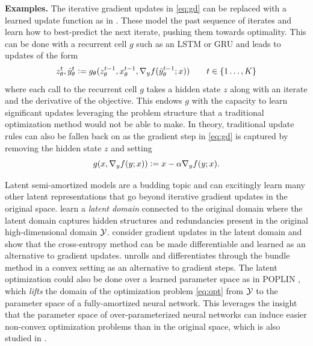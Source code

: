 \textbf{Examples.}
The iterative gradient updates in \cref{eq:gd}
can be replaced with a learned update function as in
\citet{ravi2016optimization,li2016learning,andrychowicz2016learning,li2017learning}.
These model the past sequence of iterates and learn how
to best-predict the next iterate, pushing them towards optimality.
This can be done with a recurrent cell $g$ such
as an LSTM \citep{hochreiter1997long} or GRU \citep{cho2014learning}
and leads to updates of the form
\begin{equation}
  z^t_\theta, \hat y^{t}_\theta \vcentcolon= g_\theta(z^{t-1}_\theta, x^{t-1}_\theta, \nabla_y f(\hat y^{t-1}_\theta; x)) \qquad t\in\{1\ldots,K\}
  \label{eq:rec}
\end{equation}
where each call to the recurrent cell $g$
takes a hidden state $z$ along with an iterate and
the derivative of the objective.
This endows $g$ with the capacity to learn significant
updates leveraging the problem structure that a
traditional optimization method would not be able
to make.
In theory, traditional update rules can also be
fallen back on as the gradient step in \cref{eq:gd}
is captured by removing the hidden state $z$ and
setting
\begin{equation}
  g(x, \nabla_y f(y; x))\vcentcolon= x-\alpha\nabla_y f(y; x).
  \label{eq:rec-grad-step}
\end{equation}

Latent semi-amortized models are a budding topic and can
excitingly learn many other latent representations
that go beyond iterative gradient updates in the original
space.
\citet{luo2018neural,amos2019dcem}
learn a \emph{latent domain} connected to the
original domain where the latent domain captures
hidden structures and redundancies present in
the original high-dimensional domain ${\mathcal{Y}}$.
\citet{luo2018neural} consider gradient updates
in the latent domain and \citet{amos2019dcem}
show that the cross-entropy method \citep{de2005tutorial}
can be made differentiable and learned as an alternative
to gradient updates.
\citet{amos2017input} unrolls and differentiates through
the bundle method \citep{smola2007bundle} in a convex setting
as an alternative to gradient steps.
The latent optimization could also be done over a learned parameter
space as in POPLIN \citep{wang2019exploring}, which \emph{lifts}
the domain of the optimization problem \cref{eq:opt}
from ${\mathcal{Y}}$ to the parameter space of a fully-amortized neural network.
This leverages the insight that the parameter space of
over-parameterized neural networks can induce easier
non-convex optimization problems than in the original
space, which is also studied in \citet{hoyer2019neural}.

